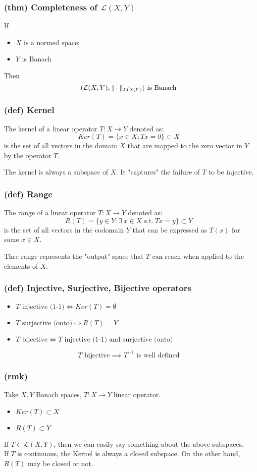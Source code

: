 \subsubsection{(thm) Completeness of $\mathcal L(X,Y)$}
If
\begin{itemize}
    \item $X$ is a normed space;
    \item $Y$ is Banach
\end{itemize}
Then
$$(\mathcal L(X,Y),\Vert \cdot \Vert_{\mathcal L(X,Y)}) \text{ is Banach}$$

\subsubsection{(def) Kernel}
The kernel of a linear operator $T:X\to Y$ denoted as:
$$Ker(T)=\{ x\in X:Tx=0\}\subset X$$
is the set of all vectors in the domain $X$ that are mapped to the zero vector in $Y$ by the operator $T$.

The kernel is always a subspace of $X$. It "captures" the failure of $T$ to be injective.
\subsubsection{(def) Range}
The range of a linear operator $T:X\to Y$ denoted as:
$$R(T)=\{ y\in Y:\exists\ x\in X \text{ s.t.}\ Tx=y\}\subset Y$$
is the set of all vectors in the codomain $Y$ that can be expressed as $T(x)$ for some $x\in X$.

Thre range represents the "output" space that $T$ can reach when applied to the elements of $X$.
\subsubsection{(def) Injective, Surjective, Bijective operators}
\begin{itemize}
    \item $T\text{ injective (1-1)} \iff Ker(T)=\emptyset$
    \item $T\text{ surjective (onto)} \iff R(T)=Y$
    \item $T\text{ bijective} \iff T\text{ injective (1-1) and surjective (onto)} $
\end{itemize}
$$T\text{ bijective} \implies T^{-1}\text{ is well defined} $$
\subsubsection{(rmk) }
Take $X,Y$ Banach spaces, $T:X\to Y$ linear operator.
\begin{itemize}
    \item $Ker(T)\subset X$
    \item $R(T)\subset Y$
\end{itemize}
If $T\in \mathcal L(X,Y)$, then we can easily say something about the above subspaces.\\
If $T$ is continuous, the Kernel is always a closed subspace.
On the other hand, $R(T)$ may be closed or not.
